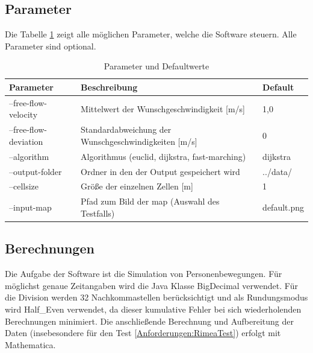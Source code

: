\subsection{Parameter}
Die Tabelle \ref{tab:parameter} zeigt alle möglichen Parameter, welche die Software steuern. Alle Parameter sind optional.
\begin{table}[htpb]
	\centering
	\begin{tabular}{lll}
		Parameter & Beschreibung  &  Default\\ \hline
		--free-flow-velocity & Mittelwert der Wunschgeschwindigkeit [m/s] & 1,0 \\
		--free-flow-deviation & Standardabweichung der Wunschgeschwindigkeiten [m/s] & 0 \\
		--algorithm & Algorithmus (euclid, dijkstra, fast-marching) & dijkstra \\
		--output-folder & Ordner in den der Output gespeichert wird & ../data/ \\
		--cellsize & Größe der einzelnen Zellen [m] & 1 \\
		--input-map & Pfad zum Bild der map (Auswahl des Testfalls) & default.png \\
		
	\end{tabular}
	\caption{Parameter und Defaultwerte}
	\label{tab:parameter}
\end{table}
	
\subsection{Berechnungen}
Die Aufgabe der Software ist die Simulation von Personenbewegungen. Für möglichst genaue Zeitangaben wird die Java Klasse BigDecimal verwendet. Für die Division werden 32 Nachkommastellen berücksichtigt und als Rundungsmodus wird Half\_Even verwendet, da dieser kumulative Fehler bei sich wiederholenden Berechnungen minimiert. Die anschließende Berechnung und Aufbereitung der Daten (insebesondere für den Test \ref{Anforderungen:RimeaTest}) erfolgt mit Mathematica.

